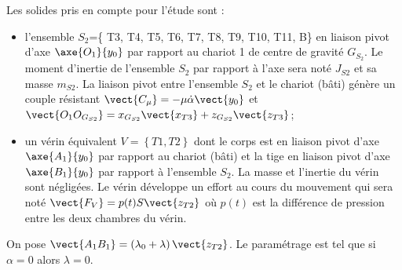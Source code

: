 Les solides pris en compte pour l’étude sont :
\begin{itemize}
\item l'ensemble $S_2$=\{ T3, T4, T5, T6, T7, T8, T9, T10, T11, B\} en liaison pivot d'axe $\axe{O_1}{y_0}$ par rapport au chariot 1 de centre de gravité $G_{S_2}$. Le moment d’inertie de l’ensemble $S_2$ par rapport à l’axe sera noté $J_{S2}$ et sa masse $m_{S2}$. La liaison pivot entre l’ensemble $S_2$ et le chariot (bâti) génère un couple résistant $\vect{C_{\mu}}=-\mu\dot{\alpha}\vect{y_0}$ et $\vect{O_1O_{G_{S2}}}=x_{G_{S2}} \vect{x_{T3}}+z_{G_{S2}} \vect{z_{T3}}$; 
\item un vérin équivalent $V=\left\{ T1,T2\right\}$ dont le corps est en liaison pivot d’axe $\axe{A_1}{y_0}$ par rapport au chariot (bâti) et la tige en liaison pivot d’axe $\axe{B_1}{y_0}$ par rapport à l’ensemble $S_2$. La masse et l’inertie du vérin sont négligées. Le vérin développe un effort au cours du mouvement qui sera noté $\vect{F_V} = p(t) S \vect{z_{T2}}$ où $p(t)$ est la différence de pression entre les deux chambres du vérin.
\end{itemize}


On pose $\vect{A_1B_1} = \left( \lambda_0+\lambda\right)\vect{z_{T2}}$. Le paramétrage est tel que si $\alpha=0$ alors $\lambda=0$.
\fi

%
%


